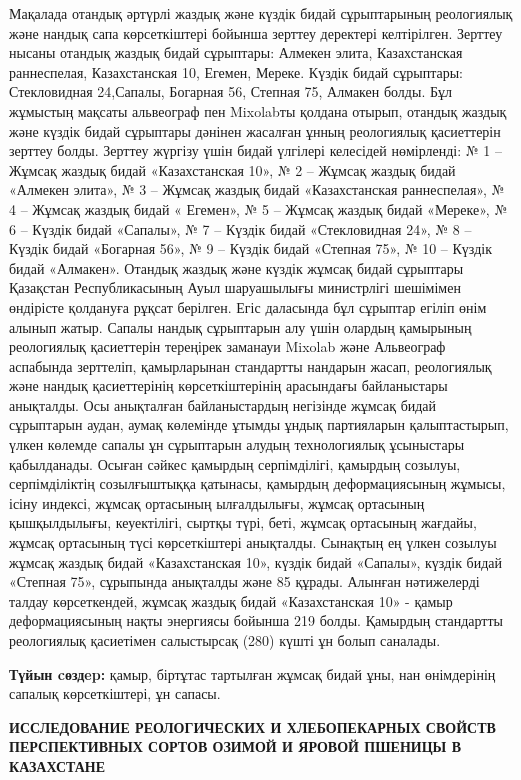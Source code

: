 {Мақалада отандық әртүрлі жаздық және күздік бидай сұрыптарының
реологиялық және нандық сапа көрсеткіштері бойынша зерттеу деректері
келтірілген. Зерттеу нысаны отандық жаздық бидай сұрыптары: Алмекен
элита, Казахстанская раннеспелая, Казахстанская 10, Егемен, Мереке.
Күздік бидай сұрыптары: Стекловидная 24,Сапалы, Богарная 56, Степная 75,
Алмакен болды. Бұл жұмыстың мақсаты альвеограф пен Mixolabты қолдана
отырып, отандық жаздық және күздік бидай сұрыптары дәнінен жасалған
ұнның реологиялық қасиеттерін зерттеу болды. Зерттеу жүргізу үшін бидай
үлгілері келесідей нөмірленді: № 1 -- Жұмсақ жаздық бидай «Казахстанская
10», № 2 -- Жұмсақ жаздық бидай «Алмекен элита», № 3 -- Жұмсақ жаздық
бидай «Казахстанская раннеспелая», № 4 -- Жұмсақ жаздық бидай « Егемен»,
№ 5 -- Жұмсақ жаздық бидай «Мереке», № 6 -- Күздік бидай «Сапалы», № 7
-- Күздік бидай «Стекловидная 24», № 8 -- Күздік бидай «Богарная 56», №
9 -- Күздік бидай «Степная 75», № 10 -- Күздік бидай «Алмакен». Отандық
жаздық және күздік жұмсақ бидай сұрыптары Қазақстан Республикасының Ауыл
шаруашылығы министрлігі шешімімен өндірісте қолдануға рұқсат берілген.
Егіс даласында бұл сұрыптар егіліп өнім алынып жатыр. Сапалы нандық
сұрыптарын алу үшін олардың қамырының реологиялық қасиеттерін тереңірек
заманауи Mixolab және Альвеограф аспабында зерттеліп, қамырларынан
стандартты нандарын жасап, реологиялық және нандық қасиеттерінің
көрсеткіштерінің арасындағы байланыстары анықталды. Осы анықталған
байланыстардың негізінде жұмсақ бидай сұрыптарын аудан, аумақ көлемінде
ұтымды ұндық партияларын қалыптастырып, үлкен көлемде сапалы ұн
сұрыптарын алудың технологиялық ұсыныстары қабылданады. Осыған сәйкес
қамырдың серпімділігі, қамырдың созылуы, серпімділіктің созылғыштыққа
қатынасы, қамырдың деформациясының жұмысы, ісіну индексі, жұмсақ
ортасының ылғалдылығы, жұмсақ ортасының қышқылдылығы, кеуектілігі,
сыртқы түрі, беті, жұмсақ ортасының жағдайы, жұмсақ ортасының түсі
көрсеткіштері анықталды. Сынақтың ең үлкен созылуы жұмсақ жаздық бидай
«Казахстанская 10», күздік бидай «Сапалы», күздік бидай «Степная 75»,
сұрыпында анықталды және 85 құрады. Алынған нәтижелерді талдау
көрсеткендей, жұмсақ жаздық бидай «Казахстанская 10» - қамыр
деформациясының нақты энергиясы бойынша 219 болды. Қамырдың стандартты
реологиялық қасиетімен салыстырсақ (280) күшті ұн болып саналады.

{\bfseries Түйын cөздep:} қамыр, біртұтас тартылған жұмсақ бидай ұны, нан
өнімдерінің сапалық көрсеткіштері, ұн сапасы.

{\bfseries ИССЛЕДОВАНИЕ РЕОЛОГИЧЕСКИХ И ХЛЕБОПЕКАРНЫХ СВОЙСТВ ПЕРСПЕКТИВНЫХ
СОРТОВ ОЗИМОЙ И ЯРОВОЙ ПШЕНИЦЫ В КАЗАХСТАНЕ}

}
